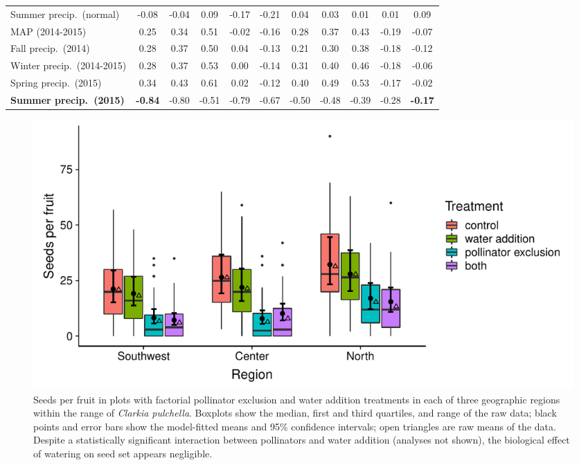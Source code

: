 \documentclass{article}
\begin{document}
\begin{landscape}
\begin{longtable}[p]{lcccccccccc}
Summer precip.\ (normal)        & -0.08          & -0.04     & 0.09      & -0.17     & -0.21     & 0.04    & 0.03     & 0.01     & 0.01     & 0.09     \\
MAP (2014-2015)                & 0.25           & 0.34      & 0.51      & -0.02     & -0.16     & 0.28    & 0.37     & 0.43     & -0.19    & -0.07    \\
Fall precip.\ (2014)            & 0.28           & 0.37      & 0.50      & 0.04      & -0.13     & 0.21    & 0.30     & 0.38     & -0.18    & -0.12    \\
Winter precip.\ (2014-2015)     & 0.28           & 0.37      & 0.53      & 0.00      & -0.14     & 0.31    & 0.40     & 0.46     & -0.18    & -0.06    \\
Spring precip.\ (2015)          & 0.34           & 0.43      & 0.61      & 0.02      & -0.12     & 0.40    & 0.49     & 0.53     & -0.17    & -0.02    \\
\textbf{Summer precip.\ (2015)} & \textbf{-0.84} & -0.80     & -0.51     & -0.79     & -0.67     & -0.50   & -0.48    & -0.39    & -0.28    & \textbf{-0.17}   \\
\bottomrule
\end{longtable}
\end{landscape}


\clearpage

\begin{figure}[p]
\centering
\includegraphics[width = \textwidth]{figs/seeds_water.pdf}
\caption{Seeds per fruit in plots with factorial pollinator exclusion and water addition treatments in each of three geographic regions within the range of \textit{Clarkia pulchella}. Boxplots show the median, first and third quartiles, and range of the raw data; black points and error bars show the model-fitted means and 95\% confidence intervals; open triangles are raw means of the data. Despite a statistically significant interaction between pollinators and water addition (analyses not shown), the biological effect of watering on seed set appears negligible.}
\label{seedswater}
\end{figure}
\end{document}

